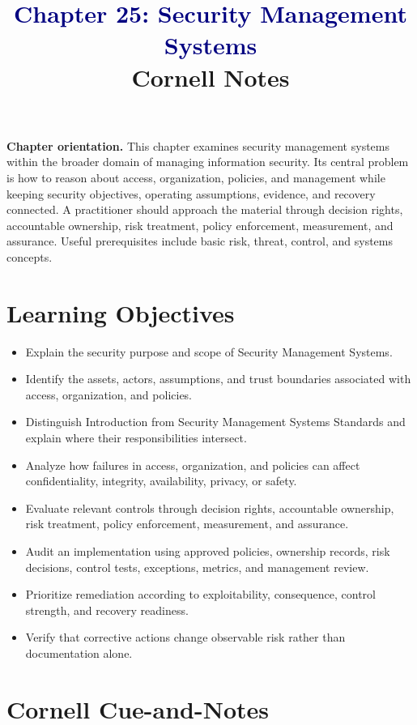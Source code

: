 \documentclass[11pt]{article}
\title{\textcolor{Navy}{Chapter 25: Security Management Systems}\\[2mm]\large Cornell Notes}
\author{}
\date{}
\begin{document}
\maketitle
\thispagestyle{fancy}
\vspace{-1.5em}
\begin{orientationbox}
\textbf{Chapter orientation.} This chapter examines security management systems within the broader domain of managing information security. Its central problem is how to reason about access, organization, policies, and management while keeping security objectives, operating assumptions, evidence, and recovery connected. A practitioner should approach the material through decision rights, accountable ownership, risk treatment, policy enforcement, measurement, and assurance. Useful prerequisites include basic risk, threat, control, and systems concepts.
\end{orientationbox}
\section*{Learning Objectives}
\begin{itemize}
\item Explain the security purpose and scope of Security Management Systems.
\item Identify the assets, actors, assumptions, and trust boundaries associated with access, organization, and policies.
\item Distinguish Introduction from Security Management Systems Standards and explain where their responsibilities intersect.
\item Analyze how failures in access, organization, and policies can affect confidentiality, integrity, availability, privacy, or safety.
\item Evaluate relevant controls through decision rights, accountable ownership, risk treatment, policy enforcement, measurement, and assurance.
\item Audit an implementation using approved policies, ownership records, risk decisions, control tests, exceptions, metrics, and management review.
\item Prioritize remediation according to exploitability, consequence, control strength, and recovery readiness.
\item Verify that corrective actions change observable risk rather than documentation alone.
\end{itemize}
\section*{Cornell Cue-and-Notes}
\end{document}
